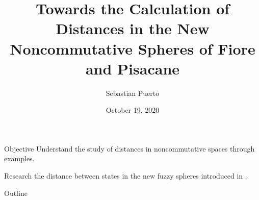 \documentclass{beamer}
\title[l]{Towards the Calculation of Distances in the New Noncommutative Spheres of Fiore and Pisacane}
\author{Sebastian Puerto}
\institute{Universidad de los Andes\\ Seminario de Física-Matemática}
\date{October 19, 2020}
\theoremstyle{definition}
\theoremstyle{remark}
\begin{document}
\begin{frame}[noframenumbering]
  \titlepage
\end{frame}

\begin{frame}{Objective} %
Understand the study of distances in noncommutative spaces through examples.

Research the distance between states in the new fuzzy spheres introduced in \cite{Fiore2018}.
\end{frame}

\begin{frame}[noframenumbering]{Outline}
  \tableofcontents
\end{frame}




%








\printbibliography[title=References]
\end{document}
